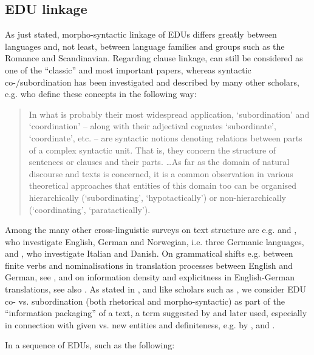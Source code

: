\documentclass[output=paper]{LSP/langsci}
\begin{document}
\subsection{EDU linkage}\label{sec:korzen:3.4}

As just stated, morpho-syntactic linkage of EDUs differs greatly between languages and, not least, between language families and groups such as the Romance and Scandinavian. Regarding clause linkage, \citet{Lehmann1988} can still be considered as one of the ``classic'' and most important papers, whereas syntactic co-/subordination has been investigated and described by many other scholars, e.g. \citet[2-3]{Fabricius-Hansen2008ed} who define these concepts in the following way: 

\begin{quote}
In what is probably their most widespread application, `subordination' and `coordination' -- along with their adjectival cognates `subordinate', `coordinate', etc. -- are syntactic notions denoting relations between parts of a complex syntactic unit. That is, they concern the structure of sentences or clauses and their parts. \ldots As far as the domain of natural discourse and texts is concerned, it is a common observation in various theoretical approaches that entities of this domain too can be organised hierarchically (`subordinating', `hypotactically') or non-hierarchically (`coordinating', `paratactically').
\end{quote}

Among the many other cross-linguistic surveys on text structure are e.g.\linebreak\citet{Fabricius-Hansen1996,Fabricius-Hansen1998} and \citet{Ramm2005}, who investigate English, German and Norwegian, i.e. three Germanic languages, and \citeauthor{Skytte2000}, who investigate Italian and Danish. On grammatical shifts e.g. between finite verbs and nominalisations in translation processes between English and German, see \citet{AlvesEtAl2010}, and on information density and explicitness in English-German translations, see also \citet{Hansen-Schirra2007}. As stated in , and like scholars such as \citet[594]{Asher2005}, we consider EDU co- vs. subordination (both rhetorical and morpho-syntactic) as part of the ``information packaging'' of a text, a term suggested by \citet[28]{Chafe1976} and later used, especially in connection with given vs. new entities and definiteness, e.g. by \citet{Clark1977Comprehension}, and \citet{Vallduví1996}. 

In a sequence of EDUs, such as the following:
\end{document}
